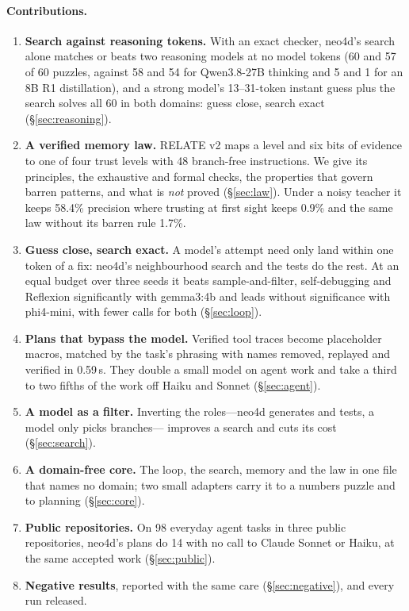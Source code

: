 \documentclass[10pt]{article}
\begin{document}
\paragraph{Contributions.}
\begin{enumerate}
  \item \textbf{Search against reasoning tokens.} With an exact checker, neo4d's search alone matches or beats two
  reasoning models at no model tokens (60 and 57 of 60 puzzles, against 58 and 54 for Qwen3.8-27B thinking and 5 and 1
  for an 8B R1 distillation), and a strong model's 13--31-token instant guess plus the search solves all 60 in both
  domains: guess close, search exact (\S\ref{sec:reasoning}).
  \item \textbf{A verified memory law.} RELATE v2 maps a level and six bits of evidence to one of four trust levels
  with 48 branch-free instructions. We give its principles, the exhaustive and formal checks, the properties that govern
  barren patterns, and what is \emph{not} proved (\S\ref{sec:law}). Under a noisy teacher it keeps 58.4\% precision
  where trusting at first sight keeps 0.9\% and the same law without its barren rule 1.7\%.
  \item \textbf{Guess close, search exact.} A model's attempt need only land within one token of a fix: neo4d's
  neighbourhood search and the tests do the rest. At an equal budget over three seeds it beats sample-and-filter,
  self-debugging and Reflexion significantly with gemma3:4b and leads without significance with phi4-mini, with
  fewer calls for both (\S\ref{sec:loop}).
  \item \textbf{Plans that bypass the model.} Verified tool traces become placeholder macros, matched by the task's
  phrasing with names removed, replayed and verified in 0.59\,s. They double a small model on agent work and take a
  third to two fifths of the work off Haiku and Sonnet (\S\ref{sec:agent}).
  \item \textbf{A model as a filter.} Inverting the roles---neo4d generates and tests, a model only picks branches---
  improves a search and cuts its cost (\S\ref{sec:search}).
  \item \textbf{A domain-free core.} The loop, the search, memory and the law in one file that names no domain; two
  small adapters carry it to a numbers puzzle and to planning (\S\ref{sec:core}).
  \item \textbf{Public repositories.} On 98 everyday agent tasks in three public repositories, neo4d's plans do 14 with
  no call to Claude Sonnet or Haiku, at the same accepted work (\S\ref{sec:public}).
  \item \textbf{Negative results}, reported with the same care (\S\ref{sec:negative}), and every run released.
\end{enumerate}
\end{document}
